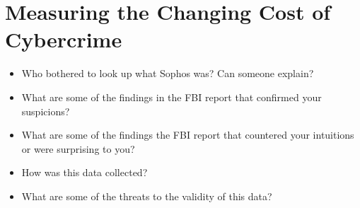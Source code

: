 \documentclass[11pt]{article}
\begin{document}
\section*{Measuring the Changing Cost of Cybercrime}

\begin{itemize}
    \item Who bothered to look up what Sophos was? Can someone explain?
    \item What are some of the findings in the FBI report that confirmed your suspicions?
    \item What are some of the findings the FBI report that countered your intuitions or were surprising to you? 
    \item How was this data collected?
    \item What are some of the threats to the validity of this data?
\end{itemize}
\end{document}
